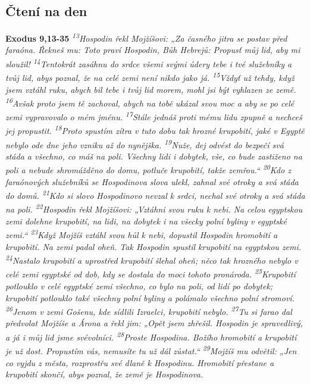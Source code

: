 \documentclass[11pt]{article}
\begin{document}
\subsection*{Čtení na den}
\textbf{Exodus 9,13-35}
\newline
\textit{
\textsuperscript{13}Hospodin řekl Mojžíšovi: „Za časného jitra se postav před faraóna. Řekneš mu: Toto praví Hospodin, Bůh Hebrejů: Propusť můj lid, aby mi sloužil!
\textsuperscript{14}Tentokrát zasáhnu do srdce všemi svými údery tebe i tvé služebníky a tvůj lid, abys poznal, že na celé zemi není nikdo jako já.
\textsuperscript{15}Vždyť už tehdy, když jsem vztáhl ruku, abych bil tebe i tvůj lid morem, mohl jsi být vyhlazen ze země.
\textsuperscript{16}Avšak proto jsem tě zachoval, abych na tobě ukázal svou moc a aby se po celé zemi vypravovalo o mém jménu.
\textsuperscript{17}Stále jednáš proti mému lidu zpupně a nechceš jej propustit.
\textsuperscript{18}Proto spustím zítra v tuto dobu tak hrozné krupobití, jaké v Egyptě nebylo ode dne jeho vzniku až do nynějška.
\textsuperscript{19}Nuže, dej odvést do bezpečí svá stáda a všechno, co máš na poli. Všechny lidi i dobytek, vše, co bude zastiženo na poli a nebude shromážděno do domu, potluče krupobití, takže zemřou.“
\textsuperscript{20}Kdo z faraónových služebníků se Hospodinova slova ulekl, zahnal své otroky a svá stáda do domů.
\textsuperscript{21}Kdo si slovo Hospodinovo nevzal k srdci, nechal své otroky a svá stáda na poli.
\textsuperscript{22}Hospodin řekl Mojžíšovi: „Vztáhni svou ruku k nebi. Na celou egyptskou zemi dolehne krupobití, na lidi, na dobytek i na všecky polní byliny v egyptské zemi.“
\textsuperscript{23}Když Mojžíš vztáhl svou hůl k nebi, dopustil Hospodin hromobití a krupobití. Na zemi padal oheň. Tak Hospodin spustil krupobití na egyptskou zemi.
\textsuperscript{24}Nastalo krupobití a uprostřed krupobití šlehal oheň; něco tak hrozného nebylo v celé zemi egyptské od dob, kdy se dostala do moci tohoto pronároda.
\textsuperscript{25}Krupobití potlouklo v celé egyptské zemi všechno, co bylo na poli, od lidí po dobytek; krupobití potlouklo také všechny polní byliny a polámalo všechno polní stromoví.
\textsuperscript{26}Jenom v zemi Gošenu, kde sídlili Izraelci, krupobití nebylo.
\textsuperscript{27}Tu si farao dal předvolat Mojžíše a Árona a řekl jim: „Opět jsem zhřešil. Hospodin je spravedlivý, a já i můj lid jsme svévolníci.
\textsuperscript{28}Proste Hospodina. Božího hromobití a krupobití je už dost. Propustím vás, nemusíte tu už dál zůstat.“
\textsuperscript{29}Mojžíš mu odvětil: „Jen co vyjdu z města, rozprostřu své dlaně k Hospodinu. Hromobití přestane a krupobití skončí, abys poznal, že země je Hospodinova.
}
\end{document}
